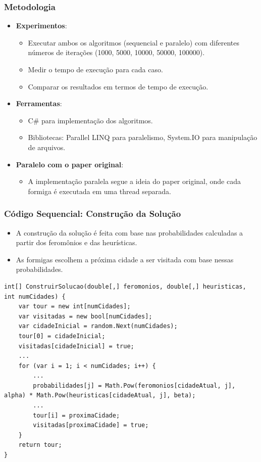 \documentclass{beamer}
\begin{document}
\begin{frame}
\frametitle{Metodologia}
\begin{itemize}
    \item \textbf{Experimentos}:
    \begin{itemize}
        \item Executar ambos os algoritmos (sequencial e paralelo) com diferentes números de iterações (1000, 5000, 10000, 50000, 100000).
        \item Medir o tempo de execução para cada caso.
        \item Comparar os resultados em termos de tempo de execução.
    \end{itemize}
    \item \textbf{Ferramentas}:
    \begin{itemize}
        \item C\# para implementação dos algoritmos.
        \item Bibliotecas: Parallel LINQ para paralelismo, System.IO para manipulação de arquivos.
    \end{itemize}
    \item \textbf{Paralelo com o paper original}:
    \begin{itemize}
        \item A implementação paralela segue a ideia do paper original, onde cada formiga é executada em uma thread separada.
    \end{itemize}
\end{itemize}
\end{frame}

\begin{frame}
\frametitle{Código Sequencial: Construção da Solução}
\begin{itemize}
    \item A construção da solução é feita com base nas probabilidades calculadas a partir dos feromônios e das heurísticas.
    \item As formigas escolhem a próxima cidade a ser visitada com base nessas probabilidades.
\end{itemize}
\begin{lstlisting}
int[] ConstruirSolucao(double[,] feromonios, double[,] heuristicas, int numCidades) {
    var tour = new int[numCidades];
    var visitadas = new bool[numCidades];
    var cidadeInicial = random.Next(numCidades);
    tour[0] = cidadeInicial;
    visitadas[cidadeInicial] = true;
    ...
    for (var i = 1; i < numCidades; i++) {
        ...
        probabilidades[j] = Math.Pow(feromonios[cidadeAtual, j], alpha) * Math.Pow(heuristicas[cidadeAtual, j], beta);
        ...
        tour[i] = proximaCidade;
        visitadas[proximaCidade] = true;
    }
    return tour;
}
\end{lstlisting}
\end{frame}
\end{document}
